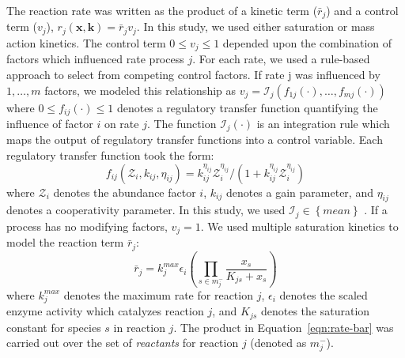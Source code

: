 \documentclass[12pt]{article}
\begin{document}
The reaction rate was written as the product of a kinetic term ($\bar{r}_{j}$) and a control term ($v_{j}$), $r_{j}\left(\mathbf{x},\mathbf{k}\right)=\bar{r}_{j}v_{j}$.
In this study, we used either saturation or mass action kinetics.
The control term $0\leq v_{j}\leq 1$ depended upon the combination of factors which influenced rate process $j$.
For each rate, we used a rule-based approach to select from competing control factors.
If rate j was influenced by $1,\dots,m$ factors, we modeled this relationship as
$v_{j}=\mathcal{I}_{j}\left(f_{1j}\left(\cdot\right),\hdots,f_{mj}\left(\cdot\right)\right)$
where $0\leq f_{ij}\left(\cdot\right)\leq 1$ denotes a regulatory transfer function quantifying the influence of factor $i$ on rate $j$.
The function $\mathcal{I}_{j}\left(\cdot\right)$ is an integration rule which maps the output of regulatory transfer functions into a control
variable. Each regulatory transfer function took the form:
\begin{equation}\label{eqn:control-factor}
	f_{ij}\left(\mathcal{Z}_{i},k_{ij},\eta_{ij}\right)=k_{ij}^{\eta_{ij}}\mathcal{Z}_{i}^{\eta_{ij}}/\left({1 + k_{ij}^{\eta_{ij}}\mathcal{Z}_{i}^{\eta_{ij}}}\right)
\end{equation}where $\mathcal{Z}_{i}$ denotes the abundance factor $i$, $k_{ij}$ denotes a gain parameter, and $\eta_{ij}$ denotes a cooperativity parameter.
In this study, we used $\mathcal{I}_{j}\in\left\{mean\right\}$ \cite{pr3010138}. If a process has no modifying factors, $v_{j}=1$.
We used multiple saturation kinetics to model the reaction term $\bar{r}_{j}$:
\begin{equation}\label{eqn:rate-bar}
	\bar{r}_{j}=k_{j}^{max}\epsilon_{i}\left(\prod_{s\in{m_{j}^{-}}}\frac{x_{s}}{K_{js} + x_{s}}\right)
\end{equation}
where $k_{j}^{max}$ denotes the maximum rate for reaction $j$, $\epsilon_{i}$ denotes the scaled enzyme activity which catalyzes reaction $j$, and
$K_{js}$ denotes the saturation constant for species $s$ in reaction $j$.
The product in Equation~\eqref{eqn:rate-bar} was carried out over the set of \textit{reactants} for reaction $j$ (denoted as $m_{j}^{-}$).
\end{document}
